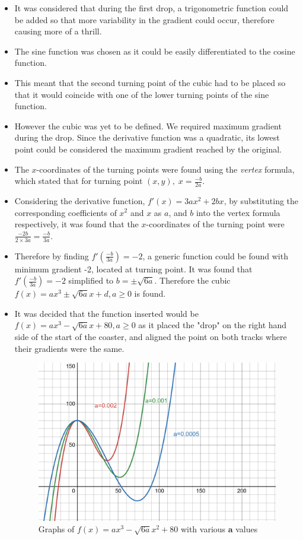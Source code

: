 \documentclass[11pt, letterpaper]{article}
\begin{document}
\begin{itemize}
	\item It was considered that during the first drop, a trigonometric function could be added so that more variability in the gradient could occur, therefore causing more of a thrill. 
	\item The sine function was chosen as it could be easily differentiated to the cosine function. 
	\item This meant that the second turning point of the cubic had to be placed so that it would coincide with one of the lower turning points of the sine function. 
	\item However the cubic was yet to be defined. We required maximum gradient during the drop. Since the derivative function was a quadratic, its lowest point could be considered the maximum gradient reached by the original.
	\item The $x$-coordinates of the turning points were found using the \textit{vertex} formula, which stated that for turning point $(x, y),\; x=\frac{-b}{2a}$.
	\item Considering the derivative function, $f'(x)=3ax^2+2bx$, by substituting the corresponding coefficients of $x^2$ and $x$ as $a$, and $b$ into the vertex formula respectively, it was found that the $x$-coordinates of the turning point were $\frac{-2b}{2\times3a}=\frac{-b}{3a}$.
	\item Therefore by finding $f'(\frac{-b}{3a})=-2$, a generic function could be found with minimum gradient -2, located at turning point. It was found that $f'(\frac{-b}{3a})=-2$ simplified to $b=\pm\sqrt{6a}$. Therefore the cubic $f(x)=ax^3\pm\sqrt{6a}x+d, a\geq0$ is found. 
	\item It was decided that the function inserted would be $f(x)=ax^3-\sqrt{6a}x+80, a\geq0$ as it placed the "drop" on the right hand side of the start of the coaster, and aligned the point on both tracks where their gradients were the same.
		\begin{figure}[h]
		\centering
		\includegraphics[width=15cm]{Eaxmple Cubic.png}
		\caption{Graphs of $f(x)=ax^{3}-\sqrt{6a}x^{2}+80$ with various $\mathbf{a}$ values}
	\end{figure}


\end{itemize}
\end{document}
